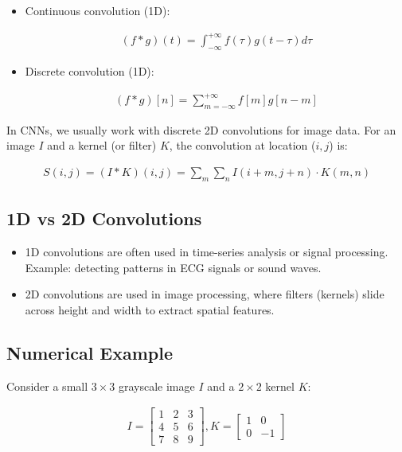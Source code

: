 \begin{itemize}
    \item Continuous convolution (1D):

    \begin{align}
    (f*g)(t)=\int_{-\infty}^{+\infty}f(\tau)g(t-\tau)d\tau
    \end{align}

    \item Discrete convolution (1D):

    \begin{align}
    (f*g)[n]=\sum_{m=-\infty}^{+\infty}f[m]g[n-m]
    \end{align}
    
\end{itemize}

In CNNs, we usually work with discrete 2D convolutions for image data. For an image \(I\) and a kernel (or filter) 
\(K\), the convolution at location (\(i,j\)) is:

\begin{align}
    S(i,j) = (I*K)(i,j)=\sum_m\sum_nI(i+m,j+n)\cdot K(m,n)
\end{align}


\subsection{1D vs 2D Convolutions}

\begin{itemize}
    \item 1D convolutions are often used in time-series analysis or signal processing.
    Example: detecting patterns in ECG signals or sound waves.

    \item 2D convolutions are used in image processing, where filters (kernels) slide across height and width to extract spatial features.
\end{itemize}

\subsection{Numerical Example}
Consider a small \(3\times3\) grayscale image \(I\) and a \(2\times2\) kernel \(K\):

\begin{align}
    I = \begin{bmatrix} 1 & 2 & 3 \\ 4 & 5 & 6 \\ 7 & 8 & 9 \end{bmatrix}, K = \begin{bmatrix} 1 &  0 \\ 0 & -1 \end{bmatrix}
\end{align}

